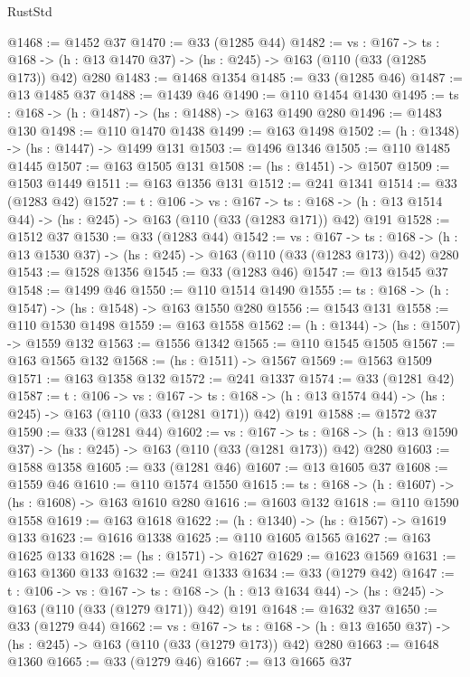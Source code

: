 \begin{lexlean}{RustStd}
\begin{coremodule}
@1468 := @1452 @37
@1470 := @33 (@1285 @44)
@1482 := {vs : @167} ->
  {ts : @168} -> (h : @13 @1470 @37) -> (hs : @245) -> @163 (@110 (@33 (@1285 @173)) @42) @280
@1483 := @1468 @1354
@1485 := @33 (@1285 @46)
@1487 := @13 @1485 @37
@1488 := @1439 @46
@1490 := @110 @1454 @1430
@1495 := {ts : @168} -> (h : @1487) -> (hs : @1488) -> @163 @1490 @280
@1496 := @1483 @130
@1498 := @110 @1470 @1438
@1499 := @163 @1498
@1502 := (h : @1348) -> (hs : @1447) -> @1499 @131
@1503 := @1496 @1346
@1505 := @110 @1485 @1445
@1507 := @163 @1505 @131
@1508 := (hs : @1451) -> @1507
@1509 := @1503 @1449
@1511 := @163 @1356 @131
@1512 := @241 @1341
@1514 := @33 (@1283 @42)
@1527 := {t : @106} ->
  {vs : @167} ->
  {ts : @168} -> (h : @13 @1514 @44) -> (hs : @245) -> @163 (@110 (@33 (@1283 @171)) @42) @191
@1528 := @1512 @37
@1530 := @33 (@1283 @44)
@1542 := {vs : @167} ->
  {ts : @168} -> (h : @13 @1530 @37) -> (hs : @245) -> @163 (@110 (@33 (@1283 @173)) @42) @280
@1543 := @1528 @1356
@1545 := @33 (@1283 @46)
@1547 := @13 @1545 @37
@1548 := @1499 @46
@1550 := @110 @1514 @1490
@1555 := {ts : @168} -> (h : @1547) -> (hs : @1548) -> @163 @1550 @280
@1556 := @1543 @131
@1558 := @110 @1530 @1498
@1559 := @163 @1558
@1562 := (h : @1344) -> (hs : @1507) -> @1559 @132
@1563 := @1556 @1342
@1565 := @110 @1545 @1505
@1567 := @163 @1565 @132
@1568 := (hs : @1511) -> @1567
@1569 := @1563 @1509
@1571 := @163 @1358 @132
@1572 := @241 @1337
@1574 := @33 (@1281 @42)
@1587 := {t : @106} ->
  {vs : @167} ->
  {ts : @168} -> (h : @13 @1574 @44) -> (hs : @245) -> @163 (@110 (@33 (@1281 @171)) @42) @191
@1588 := @1572 @37
@1590 := @33 (@1281 @44)
@1602 := {vs : @167} ->
  {ts : @168} -> (h : @13 @1590 @37) -> (hs : @245) -> @163 (@110 (@33 (@1281 @173)) @42) @280
@1603 := @1588 @1358
@1605 := @33 (@1281 @46)
@1607 := @13 @1605 @37
@1608 := @1559 @46
@1610 := @110 @1574 @1550
@1615 := {ts : @168} -> (h : @1607) -> (hs : @1608) -> @163 @1610 @280
@1616 := @1603 @132
@1618 := @110 @1590 @1558
@1619 := @163 @1618
@1622 := (h : @1340) -> (hs : @1567) -> @1619 @133
@1623 := @1616 @1338
@1625 := @110 @1605 @1565
@1627 := @163 @1625 @133
@1628 := (hs : @1571) -> @1627
@1629 := @1623 @1569
@1631 := @163 @1360 @133
@1632 := @241 @1333
@1634 := @33 (@1279 @42)
@1647 := {t : @106} ->
  {vs : @167} ->
  {ts : @168} -> (h : @13 @1634 @44) -> (hs : @245) -> @163 (@110 (@33 (@1279 @171)) @42) @191
@1648 := @1632 @37
@1650 := @33 (@1279 @44)
@1662 := {vs : @167} ->
  {ts : @168} -> (h : @13 @1650 @37) -> (hs : @245) -> @163 (@110 (@33 (@1279 @173)) @42) @280
@1663 := @1648 @1360
@1665 := @33 (@1279 @46)
@1667 := @13 @1665 @37

\end{coremodule}
\end{lexlean}
